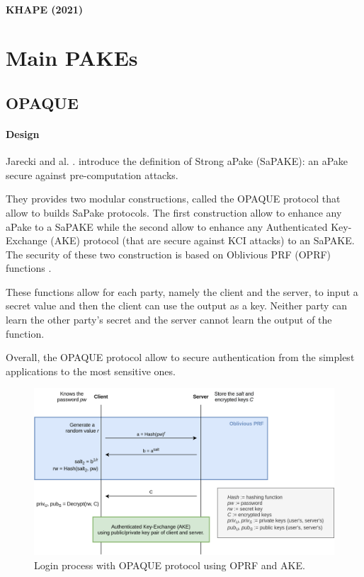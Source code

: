 \documentclass[../report.tex]{subfiles}
\begin{document}
\paragraph{KHAPE (2021)}





\section{Main PAKEs}

\subsection{OPAQUE}


\paragraph{Design}
Jarecki and al. \cite{}. introduce the definition of Strong aPake (SaPAKE): an aPake secure against pre-computation attacks.

They provides two modular constructions, called the OPAQUE protocol that allow to builds SaPake protocols. The first construction allow to enhance any aPake to a SaPAKE while the second allow to enhance any Authenticated Key-Exchange (AKE) protocol (that are secure against KCI attacks) to an SaPAKE.
The security of these two construction is based on Oblivious PRF (OPRF) functions \cite{}.

These functions allow for each party, namely the client and the server, to input a secret value and then the client can use the output as a key. Neither party can learn the other party's secret and the server cannot learn the output of the function.

Overall, the OPAQUE protocol allow to secure authentication from the simplest applications to the most sensitive ones.


\begin{figure}[h]
 \centering
 \includegraphics[width=\textwidth]{OPAQUE.png}
 \caption{Login process with OPAQUE protocol using OPRF and AKE.}
 \label{fig:OPAQUE_AKE}
\end{figure}
\end{document}
